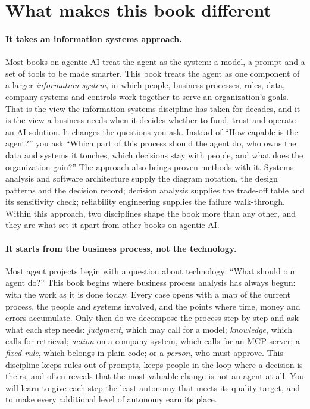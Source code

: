 \section*{What makes this book different}

\paragraph{It takes an information systems approach.} Most books on agentic AI treat the agent as the system: a model, a prompt and a set of tools to be made smarter. This book treats the agent as one component of a larger \emph{information system}, in which people, business processes, rules, data, company systems and controls work together to serve an organization's goals. That is the view the information systems discipline has taken for decades, and it is the view a business needs when it decides whether to fund, trust and operate an AI solution. It changes the questions you ask. Instead of ``How capable is the agent?'' you ask ``Which part of this process should the agent do, who owns the data and systems it touches, which decisions stay with people, and what does the organization gain?'' The approach also brings proven methods with it. Systems analysis and software architecture supply the diagram notation, the design patterns and the decision record; decision analysis supplies the trade-off table and its sensitivity check; reliability engineering supplies the failure walk-through. Within this approach, two disciplines shape the book more than any other, and they are what set it apart from other books on agentic AI.

\paragraph{It starts from the business process, not the technology.} Most agent projects begin with a question about technology: ``What should our agent do?'' This book begins where business process analysis has always begun: with the work as it is done today. Every case opens with a map of the current process, the people and systems involved, and the points where time, money and errors accumulate. Only then do we decompose the process step by step and ask what each step needs: \emph{judgment}, which may call for a model; \emph{knowledge}, which calls for retrieval; \emph{action} on a company system, which calls for an MCP server; a \emph{fixed rule}, which belongs in plain code; or a \emph{person}, who must approve. This discipline keeps rules out of prompts, keeps people in the loop where a decision is theirs, and often reveals that the most valuable change is not an agent at all. You will learn to give each step the least autonomy that meets its quality target, and to make every additional level of autonomy earn its place.

